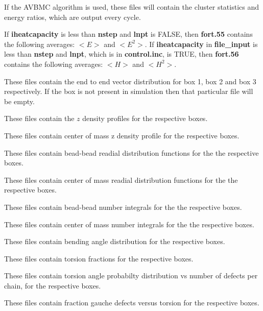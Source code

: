 \documentclass[12pt,letterpaper]{article}
\begin{document}
 If the AVBMC
algorithm is used, these files will contain the cluster
statistics and energy ratios, which are output every cycle.

 If {\bf iheatcapacity} is
less than {\bf nstep} and {\bf lnpt} is FALSE, then {\bf
  fort.55} contains the following averages: $<E>$ and
$<E^2>$. If {\bf iheatcapacity} in {\bf file\_input} is less
than {\bf nstep} and {\bf lnpt}, which is in {\bf
  control.inc}, is TRUE, then {\bf fort.56} contains the
following averages: $<H>$ and $<H^2>$.

These files contain the end to end vector distribution for
box 1, box 2 and box 3 respectively. If the box is not
present in simulation then that particular file will be
empty.

 These
files contain the $z$ density profiles for the respective
boxes.

These files contain center of mass z density profile for the
respective boxes.

These files contain bead-bead readial distribution functions
for the the respective boxes.

These files contain center of mass readial distribution
functions for the the respective boxes.

These files contain bead-bead number integrals for the the
respective boxes.

These files contain center of mass number integrals for the
the respective boxes.

 These files contain bending angle
distribution for the respective boxes.

 These files contain torsion fractions
for the respective boxes.

 These files contain torsion angle
probabilty distribution vs number of defects per chain, for
the respective boxes.

 These files contain fraction gauche
defects versus torsion for the respective boxes.
\end{document}
